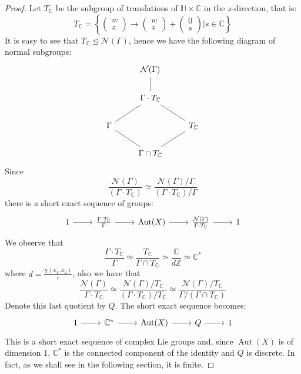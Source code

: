 \documentclass[12pt]{amsart}
\newcommand{\Z}{\mathbb{Z}}
\newcommand{\C}{\mathbb{C}}
\newcommand{\HH}{\mathbb{H}}
\newcommand{\Nc}{\mathcal{N}}
\DeclareMathOperator{\Aut}{Aut}
\begin{document}
\begin{proof}
Let $T_\C$ be the subgroup of translations of $\HH \times \C$ in the $z$-direction, that is:
\begin{equation} \label{trans}
T_\C = 
\left\{
\begin{pmatrix}
w \\
z 
\end{pmatrix} \to
\begin{pmatrix}
w \\
z 
\end{pmatrix} +
\begin{pmatrix}
0 \\
s 
\end{pmatrix} \vert s\in \C
 \right\}
\end{equation} \label{trans}
It is easy to see that $T_\C \unlhd \Nc(\Gamma)$, hence we have the following diagram of normal subgroups:
\[\begin{tikzcd}
	& {\Nc(\Gamma)} \\
	& {\Gamma\cdot T_\C} \\
	\Gamma && {T_\C} \\
	& {\Gamma\cap T_\C}
	\arrow[no head, from=1-2, to=2-2]
	\arrow[no head, from=2-2, to=3-3]
	\arrow[no head, from=3-1, to=2-2]
	\arrow[no head, from=4-2, to=3-1]
	\arrow[no head, from=4-2, to=3-3]
\end{tikzcd}\]
Since $$\frac{\Nc(\Gamma)}{(\Gamma \cdot T_\C)} \simeq \frac{\Nc(\Gamma)/\Gamma}{(\Gamma \cdot T_\C)/\Gamma}$$ there is a short exact sequence of groups:
\[\begin{tikzcd}
	1 & {\frac{\Gamma \cdot T_\C}{\Gamma}} & {\Aut(X)} & {\frac{\Nc(\Gamma)}{\Gamma\cdot T_\C}} & 1
	\arrow[from=1-1, to=1-2]
	\arrow[from=1-2, to=1-3]
	\arrow[from=1-3, to=1-4]
	\arrow[from=1-4, to=1-5]
\end{tikzcd}\]
We observe that $$\frac{\Gamma \cdot T_\C}{\Gamma} \simeq \frac{T_\C}{\Gamma \cap T_\C} \simeq \frac{\C}{d\Z}\simeq \C^*$$
where $d = \frac{\chi(x_1,x_2)}{r}$, also we have that $$\frac{\Nc(\Gamma)}{\Gamma \cdot T_\C} \simeq \frac{\Nc(\Gamma)/ T_\C}{(\Gamma \cdot T_\C)/ T_\C} \simeq \frac{\Nc(\Gamma)/ T_\C}{\Gamma / (\Gamma \cap T_\C)}$$
Denote this last quotient by $Q$. The short exact sequence becomes:
\[\begin{tikzcd}
	1 & {\C^*} & {\Aut(X)} & Q & 1
	\arrow[from=1-1, to=1-2]
	\arrow[from=1-2, to=1-3]
	\arrow[from=1-3, to=1-4]
	\arrow[from=1-4, to=1-5]
\end{tikzcd}\]
This is a short exact sequence of complex Lie groups and, since $\Aut(X)$ is of dimension $1$, $\C^*$ is the connected component of the identity and $Q$ is discrete. In fact, as we shall see in the following section, it is finite. 
\end{proof}
\end{document}
